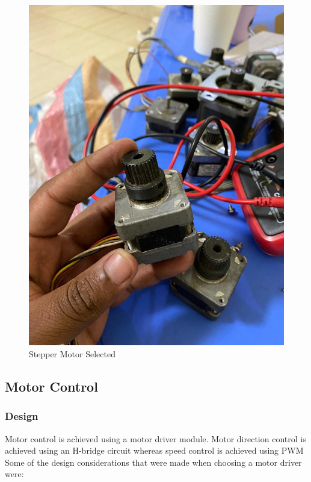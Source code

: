 \begin{figure}[H]
    \centering
    \includegraphics[scale = 0.3]{Figures/stepperMotor.jpg}
    \caption{Stepper Motor Selected}
    \label{fig:stepperMotor}
\end{figure}

\subsection{Motor Control}
\label{sec:motorControl}
\subsubsection{Design}
Motor control is achieved using a motor driver module. Motor direction control is achieved using an H-bridge circuit whereas speed control is achieved using \ac{PWM}
Some of the design considerations that were made when choosing a motor driver were: 


